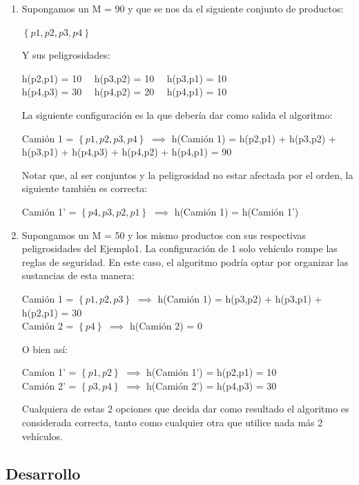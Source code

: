 \documentclass[10pt,a4paper]{article}
\begin{document}
\begin{enumerate}[leftmargin=0.5cm]

\item Supongamos un M = 90 y que se nos da el siguiente conjunto de productos:

$\left\{ {p1, p2, p3, p4}\right\}$

\noindent Y sus peligrosidades:

h(p2,p1) = 10 \ \ h(p3,p2) = 10 \ \ h(p3,p1) = 10\\
h(p4,p3) = 30 \ \ h(p4,p2) = 20 \ \ h(p4,p1) = 10

\noindent La siguiente configuración es la que debería dar como salida el algoritmo:

Camión 1 = $\left\{ {p1, p2, p3, p4}\right\}$ $\implies$ \newline
\indent h(Camión 1) = h(p2,p1) + h(p3,p2) + h(p3,p1) + h(p4,p3) + h(p4,p2) + h(p4,p1) = 90

\noindent Notar que, al ser conjuntos y la peligrosidad no estar afectada por el orden, la siguiente también es correcta:

Camión 1' = $\left\{ {p4, p3, p2, p1}\right\}$ $\implies$ h(Camión 1) = h(Camión 1')
\bigskip
\item Supongamos un M = 50 y los mismo productos con sus respectivas peligrosidades del Ejemplo1. La configuración de 1 solo vehículo rompe las reglas de seguridad. En este caso, el algoritmo podría optar por organizar las sustancias de esta manera:

Camión 1 = $\left\{{p1,p2,p3} \right\}$ $\implies$ h(Camión 1) = h(p3,p2) + h(p3,p1) + h(p2,p1) = 30\\ 
\indent Camión 2 = $\left\{{p4} \right\}$ $\implies$ h(Camión 2) = 0

\noindent O bien así:

Camíon 1' = $\left\{{p1,p2} \right\}$ $\implies$ h(Camión 1') = h(p2,p1) = 10\\
\indent Camión 2' = $\left\{{p3,p4} \right\}$ $\implies$ h(Camión 2') = h(p4,p3) = 30

\noindent Cualquiera de estas 2 opciones que decida dar como resultado el algoritmo es considerada correcta, tanto como cualquier otra que utilice nada más 2 vehículos.

\end{enumerate}
\newpage
\subsection{Desarrollo}
\end{document}
